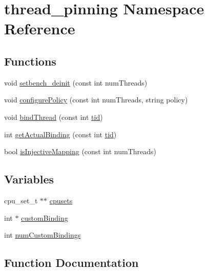 \hypertarget{namespacethread__pinning}{}\section{thread\+\_\+pinning Namespace Reference}
\label{namespacethread__pinning}
\subsection*{Functions}
\begin{DoxyCompactItemize}
\item 
void \hyperlink{namespacethread__pinning_ac1e8e55d93b77cc034100f804b3e713c}{setbench\+\_\+deinit} (const int num\+Threads)
\item 
void \hyperlink{namespacethread__pinning_abda6810a8633fe3b7b467c0d29c27303}{configure\+Policy} (const int num\+Threads, string policy)
\item 
void \hyperlink{namespacethread__pinning_ac692fe08caa63da2c77a1d55fc1c7da3}{bind\+Thread} (const int \hyperlink{microbench_2main_8cpp_a9ca9869868fe7e7a38a921cc7de4103f}{tid})
\item 
int \hyperlink{namespacethread__pinning_a3024ed19665e61e13361f77280e4b2fb}{get\+Actual\+Binding} (const int \hyperlink{microbench_2main_8cpp_a9ca9869868fe7e7a38a921cc7de4103f}{tid})
\item 
bool \hyperlink{namespacethread__pinning_a8918d0901125acd9d90e325a78a83f60}{is\+Injective\+Mapping} (const int num\+Threads)
\end{DoxyCompactItemize}
\subsection*{Variables}
\begin{DoxyCompactItemize}
\item 
cpu\+\_\+set\+\_\+t $\ast$$\ast$ \hyperlink{namespacethread__pinning_ae529f1f3dabd63c55374ca3be2676e05}{cpusets}
\item 
int $\ast$ \hyperlink{namespacethread__pinning_acf2804117d5f9bea3cbb57d08ab07dda}{custom\+Binding}
\item 
int \hyperlink{namespacethread__pinning_ad9d699e093492f19d15cd1bda6633a5e}{num\+Custom\+Bindings}
\end{DoxyCompactItemize}


\subsection{Function Documentation}
\mbox{\label{namespacethread__pinning_ac692fe08caa63da2c77a1d55fc1c7da3}} 
